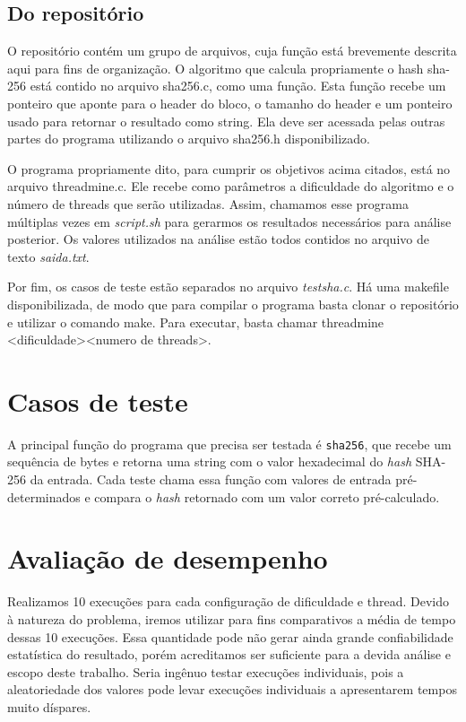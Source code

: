 \documentclass[12pt]{article}
\begin{document}
\subsection{Do repositório}
O repositório contém um grupo de arquivos, cuja função está brevemente descrita aqui para fins de organização. O algoritmo que calcula propriamente o hash sha-256 está contido no arquivo \textmd{sha256.c}, como uma função. Esta função recebe um ponteiro que aponte para o header do bloco, o tamanho do header e um ponteiro usado para retornar o resultado como string. Ela deve ser acessada pelas outras partes do programa utilizando o arquivo \textmd{sha256.h} disponibilizado.

O programa propriamente dito, para cumprir os objetivos acima citados, está no arquivo \textmd{threadmine.c}. Ele recebe como parâmetros a dificuldade do algoritmo e o número de threads que serão utilizadas. Assim, chamamos esse programa múltiplas vezes em \textsl{script.sh} para gerarmos os resultados necessários para análise posterior. Os valores utilizados na análise estão todos contidos no arquivo de texto \textsl{saida.txt}.

Por fim, os casos de teste estão separados no arquivo \textsl{testsha.c}. Há uma makefile disponibilizada, de modo que para compilar o programa basta clonar o repositório e utilizar o comando make. Para executar, basta chamar threadmine \textless dificuldade\textgreater\space\textless numero de threads\textgreater.

\section{Casos de teste}
A principal função do programa que
precisa ser testada é \texttt{sha256},
que recebe um sequência de bytes e
retorna uma string com o valor hexadecimal
do \textit{hash} SHA-256 da entrada.
Cada teste chama essa função com
valores de entrada pré-determinados e
compara o \textit{hash} retornado
com um valor correto pré-calculado.

\section{Avaliação de desempenho}
Realizamos 10 execuções para cada configuração de dificuldade e thread. Devido à natureza do problema, iremos utilizar para fins comparativos a média de tempo dessas 10 execuções. Essa quantidade pode não gerar ainda grande confiabilidade estatística do resultado, porém acreditamos ser suficiente para a devida análise e escopo deste trabalho. Seria ingênuo testar execuções individuais, pois a aleatoriedade dos valores pode levar execuções individuais a apresentarem tempos muito díspares.
\end{document}
